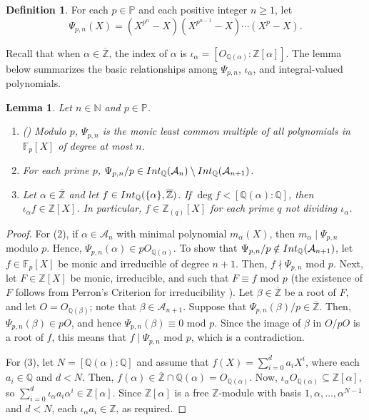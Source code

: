 \documentclass{article}
\newtheorem{Lem}[equation]{Lemma}
\theoremstyle{definition}\newtheorem{Def}[equation]{Definition}
\theoremstyle{definition}\newtheorem{Ques}[equation]{Question}
\theoremstyle{definition}\newtheorem{Conj}[equation]{Conjecture}
\theoremstyle{definition}\newtheorem{Not}[equation]{Notation}
\newcommand{\N}{\mathbb{N}}
\newcommand{\Q}{\mathbb{Q}}
\newcommand{\F}{\mathbb{F}}
\newcommand{\oZ}{\overline{\Z}}
\newcommand{\Z}{\mathbb{Z}}
\newcommand{\Int}{\textnormal{Int}}
\newcommand{\IntQ}{\Int_{\Q}}
\newcommand{\An}{\mathcal{A}_n}
\newcommand{\PP}{\mathbb{P}}
\numberwithin{equation}{section}
\begin{document}
\begin{Def}\label{BCL poly} For each $p \in \PP$ and each positive integer $n \geq 1$, let \begin{equation*}
\Psi_{p,n}(X) = (X^{p^n}-X)(X^{p^{n-1}}-X) \cdots (X^p-X).
\end{equation*}
\end{Def}

Recall that when $\alpha \in \oZ$, the index of $\alpha$ is $\iota_\alpha = [O_{\Q(\alpha)} : \Z[\alpha]]$. The lemma below summarizes the basic relationships among $\Psi_{p,n}$, $\iota_\alpha$, and integral-valued polynomials.

\begin{Lem}\label{Psi and index}%
Let  $n\in\N$ and $p\in\PP$.
\begin{enumerate}[(1)]%
\item (\cite[Theorem 3]{BCL}) Modulo $p$, $\Psi_{p,n}$ is the monic least common multiple of all polynomials in $\F_p[X]$ of degree at most $n$.
\item For each prime $p$, $\Psi_{p,n}/p \in \IntQ(\An) \setminus \IntQ(\mathcal{A}_{n+1})$.
\item Let $\alpha \in \oZ$ and let $f \in \IntQ(\{\alpha\}, \oZ)$. If $\deg f < [\Q(\alpha): \Q]$, then $\iota_\alpha f \in \Z[X]$. In particular, $f\in\Z_{(q)}[X]$ for each prime $q$ not dividing $\iota_{\alpha}$.
\end{enumerate}
\end{Lem}
\begin{proof}
For (2), if $\alpha \in \An$ with minimal polynomial $m_\alpha(X)$, then $m_\alpha \mid \Psi_{p,n}$ modulo $p$. Hence, $\Psi_{p,n}(\alpha) \in pO_{\Q(\alpha)}$. To show that $\Psi_{p,n}/p \notin \IntQ(\mathcal{A}_{n+1})$, let $f \in \F_p[X]$ be monic and irreducible of degree $n+1$. Then, $f \nmid \Psi_{p,n}$ mod $p$. Next, let $F \in \Z[X]$ be monic, irreducible, and such that $F \equiv f$ mod $p$ (the existence of $F$ follows from Perron's Criterion for irreducibility \cite[Theorem 2.2.5]{Pra}). Let $\beta \in \oZ$ be a root of $F$, and let $O = O_{\Q(\beta)}$; note that $\beta\in\mathcal A_{n+1}$. Suppose that $\Psi_{p,n}(\beta)/p \in \oZ$. Then, $\Psi_{p,n}(\beta) \in pO$, and hence $\Psi_{p,n}(\beta) \equiv 0$ mod $p$. Since the image of $\beta$ in $O/pO$ is a root of $f$, this means that $f \mid \Psi_{p,n}$ mod $p$, which is a contradiction.

For (3), let $N = [\Q(\alpha): \Q]$ and assume that $f(X) = \sum_{i=0}^d a_i X^i$, where each $a_i \in \Q$ and $d < N$. Then, $f(\alpha) \in \oZ \cap \Q(\alpha) =  O_{\Q(\alpha)}$. Now, $\iota_\alpha O_{\Q(\alpha)} \subseteq \Z[\alpha]$, so $\sum_{i=0}^d \iota_\alpha a_i \alpha^i \in \Z[\alpha]$. Since $\Z[\alpha]$ is a free $\Z$-module with basis $1, \alpha, \ldots, \alpha^{N-1}$ and $d < N$, each $\iota_\alpha a_i \in \Z$, as required.
\end{proof}
\end{document}
